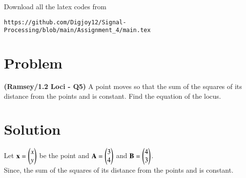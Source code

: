\documentclass[journal,12pt,twocolumn]{IEEEtran}
\begin{document}
%
Download all the latex codes from 
%
\begin{lstlisting}
https://github.com/Digjoy12/Signal-Processing/blob/main/Assignment_4/main.tex
\end{lstlisting}
\section*{\textbf{Problem}}
\textbf{(Ramsey/1.2 Loci - Q5)} A point moves so that the sum of the squares
of its distance from the points  and  is constant. Find the equation of the locus.
\section*{\textbf{Solution}}
Let $\mathbf{x} = \begin{pmatrix}x \\ y\end{pmatrix}$ be the point and $\mathbf{A} = \begin{pmatrix}3 \\ 4\end{pmatrix}$ and $\mathbf{B} = \begin{pmatrix}4 \\ 3\end{pmatrix}$.\\

Since, the sum of the squares of its distance from the points  and  is constant.\\
\end{document}
